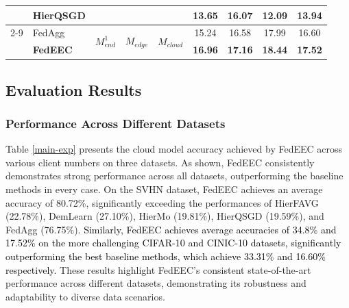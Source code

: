 \documentclass[10pt,journal]{IEEEtran}
\begin{document}
\begin{table}[]
\begin{tabular}{c|l|ccc|ccc|c}
                                   & HierQSGD                                              & \multicolumn{3}{c|}{}                                                     & 13.65                                & 16.07                                 & 12.09                                 & 13.94                             \\ \cline{2-9} 
                                   & FedAgg                                                & \multirow{2}{*}{$M_{end}^1$} & \multirow{2}{*}{$M_{edge}$} & \multirow{2}{*}{$M_{cloud}$} & 15.24                                & 16.58                                 & 17.99                                 & 16.60                             \\
                                   & \textbf{FedEEC}                                       &                        &                        &                         & \textbf{16.96}                       & \textbf{17.16}                        & \textbf{18.44}                        & \textbf{17.52}                    \\ \hline \hline
\end{tabular}
\end{table}


\subsection{Evaluation Results}
\subsubsection{Performance Across Different Datasets}
Table \ref{main-exp} presents the cloud model accuracy achieved by FedEEC across various client numbers on three datasets. As shown, FedEEC consistently demonstrates strong performance across all datasets, outperforming the baseline methods in every case. On the SVHN dataset, FedEEC achieves an average accuracy of 80.72\%, significantly exceeding the performances of HierFAVG (22.78\%), DemLearn (27.10\%), HierMo (19.81\%), HierQSGD (19.59\%), and FedAgg (76.75\%). \textcolor{black}{Similarly, FedEEC achieves average accuracies of 34.8\% and 17.52\% on the more challenging CIFAR-10 and CINIC-10 datasets, significantly outperforming the best baseline methods, which achieve 33.31\% and 16.60\% respectively.} These results highlight FedEEC’s consistent state-of-the-art performance across different datasets, demonstrating its robustness and adaptability to diverse data scenarios.
\end{document}
